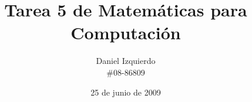 \documentclass{article}
\begin{document}

\title{Tarea 5 de Matemáticas para Computación}
\author{Daniel Izquierdo \\ \#08-86809}
\date{25 de junio de 2009}

\maketitle

\section{}

\section{}

\section{}

\section{}
\end{document}
